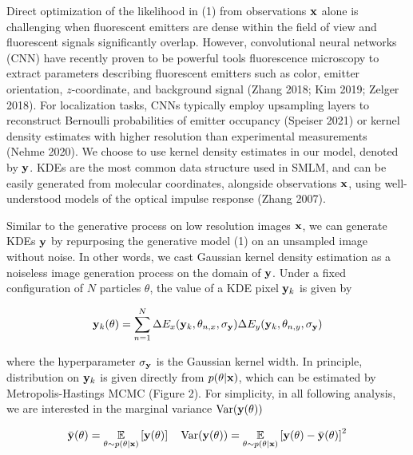 \documentclass{article}
\begin{document}
Direct optimization of the likelihood in (1) from observations $\bold{x}$ alone is challenging when fluorescent emitters are dense within the field of view and fluorescent signals significantly overlap. However, convolutional neural networks (CNN) have recently proven to be powerful tools fluorescence microscopy to extract parameters describing fluorescent emitters such as color, emitter orientation, $z$-coordinate, and background signal (Zhang 2018; Kim 2019; Zelger 2018). For localization tasks, CNNs typically employ upsampling layers to reconstruct Bernoulli probabilities of emitter occupancy (Speiser 2021) or kernel density estimates with higher resolution than experimental measurements (Nehme 2020). We choose to use kernel density estimates in our model, denoted by $\bold{y}$. KDEs are the most common data structure used in SMLM, and can be easily generated from molecular coordinates, alongside observations $\bold{x}$, using well-understood models of the optical impulse response (Zhang 2007). 

Similar to the generative process on low resolution images $\bold{x}$, we can generate KDEs $\bold{y}$ by repurposing the generative model (1) on an unsampled image without noise. In other words, we cast Gaussian kernel density estimation as a noiseless image generation process on the domain of $\bold{y}$. Under a fixed configuration of $N$ particles $\theta$, the value of a KDE pixel $\bold{y}_{k}$ is given by

\begin{equation}
\bold{y}_{k}(\theta) = \sum_{n=1}^{N}\Delta E_{x}(\bold{y}_{k},\theta_{n,x},\sigma_{\bold{y}}) \Delta E_{y}(\bold{y}_{k},\theta_{n,y},\sigma_{\bold{y}})
\end{equation}

where the hyperparameter $\sigma_{\bold{y}}$ is the Gaussian kernel width. In principle, distribution on $\bold{y}_{k}$ is given directly from $p(\theta|\bold{x})$, which can be estimated by Metropolis-Hastings MCMC (Figure 2). For simplicity, in all following analysis, we are interested in the marginal variance $\mathrm{Var} (\bold{y}(\theta))$

\begin{equation}
\bar{\bold{y}}(\theta) = \underset{\theta\sim p(\theta|\bold{x})}{\mathbb{E}}\left[ \bold{y}(\theta)\right] \quad \mathrm{Var} (\bold{y}(\theta)) = \underset{\theta\sim p(\theta|\bold{x})}{\mathbb{E}}\left[ \bold{y}(\theta)-\bar{\bold{y}}(\theta)\right]^2
\end{equation}
\end{document}
